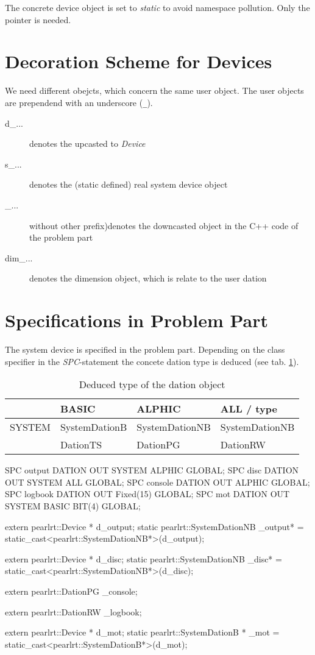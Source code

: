 The concrete device object is set to {\em static} to avoid namespace pollution.
Only the pointer is needed.

\section{Decoration Scheme for Devices}
We need different obejcts, which concern the same user object.
The user objects are prependend with an underscore (\verb|_|).

\begin{description}
\item[d\_...] denotes the upcasted to {\em Device} 
\item[s\_...] denotes the (static defined) real system device object
\item[\_...] without other prefix)denotes the downcasted object in 
     the C++ code of the problem part
\item[dim\_...] denotes the dimension object, which is relate to the 
   user dation
\end{description}

\section{Specifications in Problem Part}
The system device is specified in the problem part.
Depending on the class specifier in the {\em SPC}-statement the concete 
dation type is deduced (see tab. \ref{dationTypes}).

\begin{table}[bpht]
\begin{tabular}{l|l|l|l}
  & BASIC & ALPHIC & ALL / type \\
\hline
SYSTEM & SystemDationB & SystemDationNB & SystemDationNB \\
 & DationTS & DationPG & DationRW \\
\hline
\end{tabular}
\caption{Deduced type of the dation object}
\label{dationTypes}
\end{table}


\begin{PEARLCode}
SPC output DATION OUT SYSTEM ALPHIC GLOBAL;
SPC disc DATION OUT SYSTEM ALL GLOBAL;
SPC console DATION OUT ALPHIC GLOBAL;
SPC logbook DATION OUT Fixed(15) GLOBAL;
SPC mot DATION OUT SYSTEM BASIC BIT(4) GLOBAL;
\end{PEARLCode}

\begin{CppCode}
extern pearlrt::Device * d_output;
static pearlrt::SystemDationNB _output* = 
             static_cast<pearlrt::SystemDationNB*>(d_output);

extern pearlrt::Device * d_disc;
static pearlrt::SystemDationNB _disc* = 
             static_cast<pearlrt::SystemDationNB*>(d_disc);

extern pearlrt::DationPG _console;

extern pearlrt::DationRW _logbook;

extern pearlrt::Device * d_mot;
static pearlrt::SystemDationB * _mot = 
             static_cast<pearlrt::SystemDationB*>(d_mot);
\end{CppCode}

